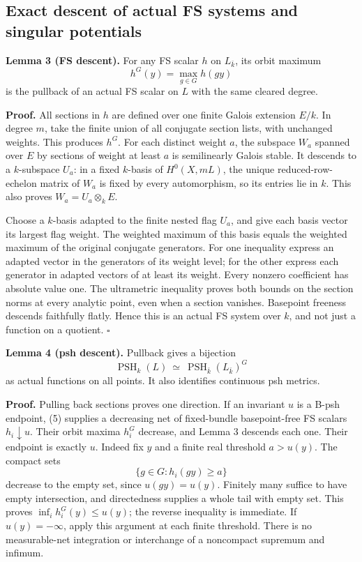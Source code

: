 \documentclass[
  11pt,
]{article}
\begin{document}
\subsection{Exact descent of actual FS systems and singular
potentials}\label{exact-descent-of-actual-fs-systems-and-singular-potentials}

\textbf{Lemma 3 (FS descent).} For any FS scalar \(h\) on
\(L_{\bar k}\), its orbit maximum \[
 h^G(y)=\max_{g\in G}h(gy)
 \tag{6}
\] is the pullback of an actual FS scalar on \(L\) with the same cleared
degree.

\textbf{Proof.} All sections in \(h\) are defined over one finite Galois
extension \(E/k\). In degree \(m\), take the finite union of all
conjugate section lists, with unchanged weights. This produces \(h^G\).
For each distinct weight \(a\), the subspace \(W_a\) spanned over \(E\)
by sections of weight at least \(a\) is semilinearly Galois stable. It
descends to a \(k\)-subspace \(U_a\): in a fixed \(k\)-basis of
\(H^0(X,mL)\), the unique reduced-row-echelon matrix of \(W_a\) is fixed
by every automorphism, so its entries lie in \(k\). This also proves
\(W_a=U_a\otimes_kE\).

Choose a \(k\)-basis adapted to the finite nested flag \(U_a\), and give
each basis vector its largest flag weight. The weighted maximum of this
basis equals the weighted maximum of the original conjugate generators.
For one inequality express an adapted vector in the generators of its
weight level; for the other express each generator in adapted vectors of
at least its weight. Every nonzero coefficient has absolute value one.
The ultrametric inequality proves both bounds on the section norms at
every analytic point, even when a section vanishes. Basepoint freeness
descends faithfully flatly. Hence this is an actual FS system over
\(k\), and not just a function on a quotient. \(\square\)

\textbf{Lemma 4 (psh descent).} Pullback gives a bijection \[
 \operatorname{PSH}_k(L)\ \simeq\
 \operatorname{PSH}_{\bar k}(L_{\bar k})^G
 \tag{7}
\] as actual functions on all points. It also identifies continuous psh
metrics.

\textbf{Proof.} Pulling back sections proves one direction. If an
invariant \(u\) is a B-psh endpoint, (5) supplies a decreasing net of
fixed-bundle basepoint-free FS scalars \(h_i\downarrow u\). Their orbit
maxima \(h_i^G\) decrease, and Lemma 3 descends each one. Their endpoint
is exactly \(u\). Indeed fix \(y\) and a finite real threshold
\(a>u(y)\). The compact sets \[
 \{g\in G:h_i(gy)\geq a\}
\] decrease to the empty set, since \(u(gy)=u(y)\). Finitely many
suffice to have empty intersection, and directedness supplies a whole
tail with empty set. This proves \(\inf_i h_i^G(y)\leq u(y)\); the
reverse inequality is immediate. If \(u(y)=-\infty\), apply this
argument at each finite threshold. There is no measurable-net
integration or interchange of a noncompact supremum and infimum.
\end{document}
